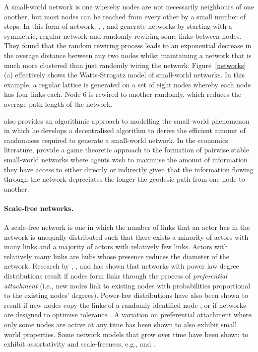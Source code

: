 A small-world network is one whereby nodes are not necessarily neighbours of one another, but most nodes can be reached from every other by a small number of steps. In this form of network, \citet{WattsStrogatz1998}, \citet{Watts1999}, and \citet{NewmanStrogatzWatts2001} generate networks by starting with a symmetric, regular network and randomly rewiring some links between nodes. They found that the random rewiring process leads to an exponential decrease in the average distance between any two nodes whilst maintaining a network that is much more clustered than just randomly wiring the network. Figure~\ref{networks} (a) effectively shows the Watts-Strogatz model of small-world networks. In this example, a regular lattice is generated on a set of eight nodes whereby each node has four links each. Node 6 is rewired to another randomly, which reduces the average path length of the network.

\citet{Kleinberg2000a, Kleinberg2000b} also provides an algorithmic approach to modelling the small-world phenomenon in which he develops a decentralised algorithm to derive the efficient amount of randomness required to generate a small-world network. In the economics literature, \citet{JacksonRogers2005} provide a game theoretic approach to the formation of pairwise stable small-world networks where agents wish to maximise the amount of information they have access to either directly or indirectly given that the information flowing through the network depreciates the longer the geodesic path from one node to another.

\paragraph{Scale-free networks.}

A scale-free network is one in which the number of links that an actor has in the network is unequally distributed such that there exists a minority of actors with many links and a majority of actors with relatively few links. Actors with relatively many links are hubs whose presence reduces the diameter of the network. Research by \citet{Price1976}, \citet{BarabasiAlbert1999}, and \citet{CooperFrieze2003} has shown that networks with power law degree distributions result if nodes form links through the process of \emph{preferential attachment} (i.e., new nodes link to existing nodes with probabilities proportional to the existing nodes' degrees). Power-law distributions have also been shown to result if new nodes copy the links of a randomly identified node \citep{Kleinberg1999, Kumar2000}, or if networks are designed to optimise tolerance \citep{Fabrikant2003}. A variation on preferential attachment where only some nodes are active at any time \citep{Klemm2002a} has been shown to also exhibit small world properties. Some network models that grow over time have been shown to exhibit assortativity and scale-freeness, e.g., \citet{Callaway2001} and \citet{Krapivsky2002}.

